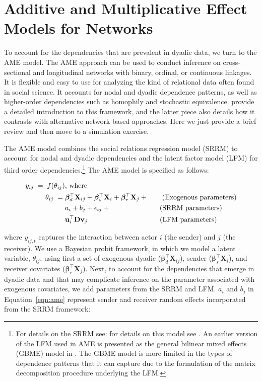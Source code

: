 \section{\textbf{Additive and Multiplicative Effect Models for Networks}}

To account for the dependencies that are prevalent in dyadic data, we turn to the AME model. The AME approach can be used to conduct inference on cross-sectional and longitudinal networks with binary, ordinal, or continuous linkages. It is flexible and easy to use for analyzing the kind of relational data often found in social science. It accounts for nodal and dyadic dependence patterns, as well as higher-order dependencies such as homophily and stochastic equivalence. \citet{hoff:2015:arxiv,minhas:etal:2016:arxiv} provide a detailed introduction to this framework, and the latter piece also details how it contrasts with alternative network based approaches. Here we just provide a brief review and then move to a simulation exercise.

The AME model combines the social relations regression model (SRRM) to account for nodal and dyadic dependencies and the latent factor model (LFM) for third order dependencies.\footnote{For details on the SRRM see: for details on this model see \citet{li:loken:2002,dorff:minhas:2016}. An earlier version of the LFM used in AME is presented as the general bilinear mixed effects (GBME) model in \citet{hoff:ward:2004}. The GBME model is more limited in the types of dependence patterns that it can capture due to the formulation of the matrix decomposition procedure underlying the LFM.} The AME model is specified as follows:

\begin{align}
	\begin{aligned}
		y_{ij} \;=\; f(\theta_{ij}) &\text{, where } \\
		\theta_{ij} \;=\;& \bm\beta_{d}^{\top} \mathbf{X}_{ij} + \bm\beta_{s}^{\top} \mathbf{X}_{i} + \bm\beta_{r}^{\top} \mathbf{X}_{j} + \text{\qquad(Exogenous parameters)} \\
		& a_{i} + b_{j} + \epsilon_{ij} + \text{\qquad\qquad\qquad\quad(SRRM parameters)} \\
		& \textbf{u}_{i}^{\top} \textbf{D} \textbf{v}_{j}  \text{\qquad\qquad\qquad\qquad\qquad\;(LFM parameters)} \\ 
	\label{eqn:ame}
	\end{aligned}
\end{align}

where $y_{ij,t}$ captures the interaction between actor $i$ (the sender) and $j$ (the receiver). We use a Bayesian probit framework, in which we model a latent variable, $\theta_{ij}$, using first a set of exogenous dyadic ($\bm\beta_{d}^{\top} \mathbf{X}_{ij}$), sender ($\bm\beta_{s}^{\top} \mathbf{X}_{i}$), and receiver covariates ($\bm\beta_{r}^{\top} \mathbf{X}_{j}$). Next, to account for the dependencies that emerge in dyadic data and that may complicate inference on the parameter associated with exogenous covariates, we add parameters from the SRRM and LFM. $a_{i}$ and $b_{j}$ in Equation~\ref{eqn:ame} represent sender and receiver random effects incorporated from the SRRM framework:

